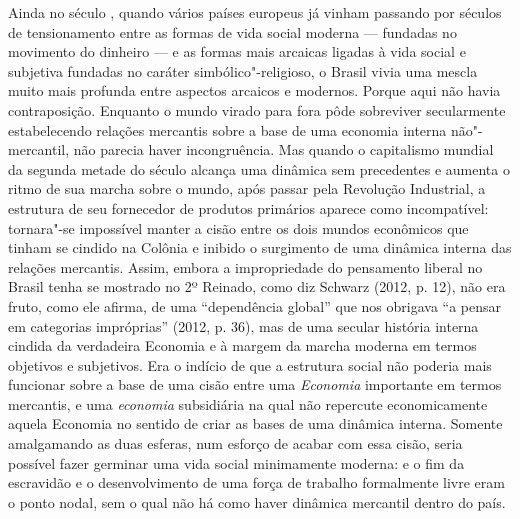 Ainda no século , quando vários países europeus já vinham passando
por séculos de tensionamento entre as formas de vida social moderna ---
fundadas no movimento do dinheiro --- e as formas mais arcaicas ligadas à
vida social e subjetiva fundadas no caráter simbólico"-religioso, o
Brasil vivia uma mescla muito mais profunda entre aspectos arcaicos e
modernos. Porque aqui não havia contraposição. Enquanto o mundo virado
para fora pôde sobreviver secularmente estabelecendo relações mercantis
sobre a base de uma economia interna não"-mercantil, não parecia haver
incongruência. Mas quando o capitalismo mundial da segunda metade do
século  alcança uma dinâmica sem precedentes e aumenta o ritmo de sua
marcha sobre o mundo, após passar pela Revolução Industrial, a estrutura
de seu fornecedor de produtos primários aparece como incompatível:
tornara"-se impossível manter a cisão entre os dois mundos econômicos que
tinham se cindido na Colônia e inibido o surgimento de uma dinâmica
interna das relações mercantis. Assim, embora a impropriedade do
pensamento liberal no Brasil tenha se mostrado no 2º Reinado, como diz
Schwarz (2012, p. 12), não era fruto, como ele afirma, de uma
``dependência global'' que nos obrigava ``a pensar em categorias
impróprias'' (2012, p. 36), mas de uma secular história interna cindida
da verdadeira Economia e à margem da marcha moderna em termos objetivos
e subjetivos. Era o indício de que a estrutura social não poderia mais
funcionar sobre a base de uma cisão entre uma \emph{Economia} importante
em termos mercantis, e uma \emph{economia} subsidiária na qual não
repercute economicamente aquela Economia no sentido de criar as bases de
uma dinâmica interna. Somente amalgamando as duas esferas, num esforço
de acabar com essa cisão, seria possível fazer germinar uma vida social
minimamente moderna: e o fim da escravidão e o desenvolvimento de uma
força de trabalho formalmente livre eram o ponto nodal, sem o qual não
há como haver dinâmica mercantil dentro do país.

